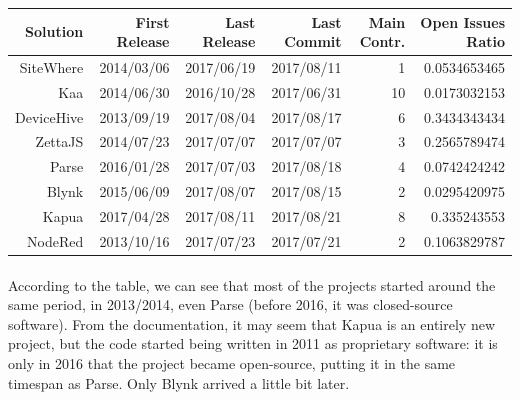 \documentclass{article}
\begin{document}
\begin{center}
\begin{tabular}{r|r|r|r|r|r}
Solution & First Release & Last Release & Last Commit & Main Contr. & Open Issues Ratio \\ \hline
SiteWhere & \cellcolor{green!25}2014/03/06 & \cellcolor{green!25}2017/06/19 & \cellcolor{green!25}2017/08/11 & \cellcolor{red!25}1 & \cellcolor{green!25}0.0534653465 \\
Kaa & \cellcolor{green!25}2014/06/30 & \cellcolor{orange!25}2016/10/28 & \cellcolor{green!25}2017/06/31 & \cellcolor{green!25}10 & \cellcolor{green!25}0.0173032153 \\
DeviceHive & \cellcolor{green!25}2013/09/19 & \cellcolor{green!25}2017/08/04 & \cellcolor{green!25}2017/08/17 & \cellcolor{green!25}6 & \cellcolor{red!25}0.3434343434 \\
ZettaJS & \cellcolor{green!25}2014/07/23 & \cellcolor{green!25}2017/07/07 & \cellcolor{green!25}2017/07/07 & \cellcolor{orange!25}3 & \cellcolor{red!25}0.2565789474 \\
Parse & \cellcolor{orange!25}2016/01/28 & \cellcolor{green!25}2017/07/03 & \cellcolor{green!25}2017/08/18 & \cellcolor{orange!25}4 & \cellcolor{green!25}0.0742424242 \\
Blynk & \cellcolor{green!25}2015/06/09 & \cellcolor{green!25}2017/08/07 & \cellcolor{green!25}2017/08/15 & \cellcolor{orange!25}2 & \cellcolor{green!25}0.0295420975 \\
Kapua & \cellcolor{red!25}2017/04/28 & \cellcolor{green!25}2017/08/11 & \cellcolor{green!25}2017/08/21 & \cellcolor{green!25}8 & \cellcolor{red!25}0.335243553 \\
NodeRed & \cellcolor{green!25}2013/10/16 & \cellcolor{green!25}2017/07/23 & \cellcolor{green!25}2017/07/21 & \cellcolor{orange!25}2 & \cellcolor{orange!25}0.1063829787 \\
\end{tabular}
\end{center}

\paragraph{} According to the table, we can see that most of the projects started around the same period, in 2013/2014, even Parse (before 2016, it was closed-source software). From the documentation, it may seem that Kapua is an entirely new project, but the code started
being written in 2011 as proprietary software: it is only in 2016 that the project became open-source, putting it in the same timespan as Parse. Only Blynk arrived a little bit later.
\end{document}
